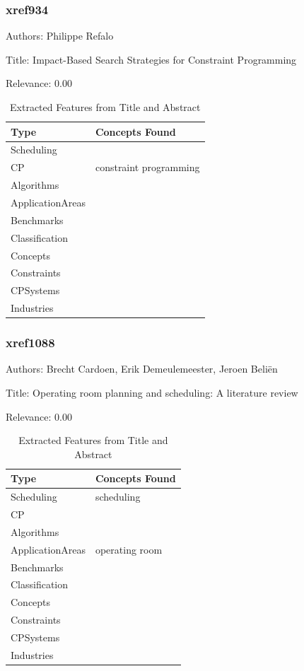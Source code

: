 \subsubsection{xref934}
\label{mw:xref934}

Authors: Philippe Refalo

Title: Impact-Based Search Strategies for Constraint Programming

Relevance:  0.00

{\scriptsize
\begin{longtable}{p{2cm}p{20cm}}
\caption{Extracted Features from Title and Abstract}\\ \toprule
Type & Concepts Found\\ \midrule
\endhead
\bottomrule
\endfoot
Scheduling & \\ 
CP & constraint programming\\ 
Algorithms & \\ 
ApplicationAreas & \\ 
Benchmarks & \\ 
Classification & \\ 
Concepts & \\ 
Constraints & \\ 
CPSystems & \\ 
Industries & \\ 
\end{longtable}
}



\subsubsection{xref1088}
\label{mw:xref1088}

Authors: Brecht Cardoen, Erik Demeulemeester, Jeroen Beliën

Title: Operating room planning and scheduling: A literature review

Relevance:  0.00

{\scriptsize
\begin{longtable}{p{2cm}p{20cm}}
\caption{Extracted Features from Title and Abstract}\\ \toprule
Type & Concepts Found\\ \midrule
\endhead
\bottomrule
\endfoot
Scheduling & scheduling\\ 
CP & \\ 
Algorithms & \\ 
ApplicationAreas & operating room\\ 
Benchmarks & \\ 
Classification & \\ 
Concepts & \\ 
Constraints & \\ 
CPSystems & \\ 
Industries & \\ 
\end{longtable}
}



